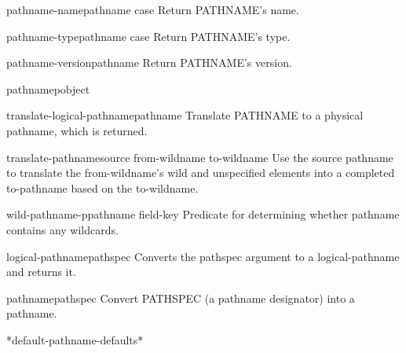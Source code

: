 \begin{function}{pathname-name}{pathname \key case}{}{}
  Return PATHNAME's name.
\end{function}

\begin{function}{pathname-type}{pathname \key case}{}{}
  Return PATHNAME's type.
\end{function}

\begin{function}{pathname-version}{pathname}{}{}
  Return PATHNAME's version.
\end{function}

\begin{function}{pathnamep}{object}{}{}
  
\end{function}

\begin{function}{translate-logical-pathname}{pathname \key}{}{}
  Translate PATHNAME to a physical pathname, which is returned.
\end{function}

\begin{function}{translate-pathname}{source from-wildname to-wildname \key}{}{}
  Use the source pathname to translate the from-wildname's wild and
   unspecified elements into a completed to-pathname based on the to-wildname.
\end{function}

\begin{function}{wild-pathname-p}{pathname \op field-key}{}{}
  Predicate for determining whether pathname contains any wildcards.
\end{function}

\begin{class}{logical-pathname}{pathspec}{}{}
  Converts the pathspec argument to a logical-pathname and returns it.
\end{class}

\begin{class}{pathname}{pathspec}{}{}
  Convert PATHSPEC (a pathname designator) into a pathname.
\end{class}

\begin{variable}{*default-pathname-defaults*}{}{}{}
  
\end{variable}
